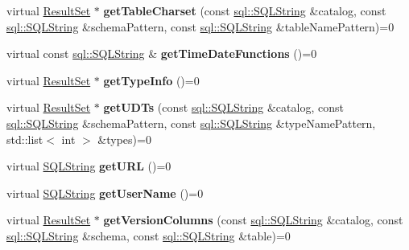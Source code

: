 \begin{DoxyCompactItemize}
\item 
\hypertarget{classsql_1_1_database_meta_data_aec136e1a062d248cb1c306965b2c70cf}{}\label{classsql_1_1_database_meta_data_aec136e1a062d248cb1c306965b2c70cf} 
virtual \hyperlink{classsql_1_1_result_set}{Result\+Set} $\ast$ {\bfseries get\+Table\+Charset} (const \hyperlink{classsql_1_1_s_q_l_string}{sql\+::\+S\+Q\+L\+String} \&catalog, const \hyperlink{classsql_1_1_s_q_l_string}{sql\+::\+S\+Q\+L\+String} \&schema\+Pattern, const \hyperlink{classsql_1_1_s_q_l_string}{sql\+::\+S\+Q\+L\+String} \&table\+Name\+Pattern)=0
\item 
\hypertarget{classsql_1_1_database_meta_data_ace7a16a15c96196290fa85198a00cfdb}{}\label{classsql_1_1_database_meta_data_ace7a16a15c96196290fa85198a00cfdb} 
virtual const \hyperlink{classsql_1_1_s_q_l_string}{sql\+::\+S\+Q\+L\+String} \& {\bfseries get\+Time\+Date\+Functions} ()=0
\item 
\hypertarget{classsql_1_1_database_meta_data_acf8340fcb22c308f2f1a7cb65519562a}{}\label{classsql_1_1_database_meta_data_acf8340fcb22c308f2f1a7cb65519562a} 
virtual \hyperlink{classsql_1_1_result_set}{Result\+Set} $\ast$ {\bfseries get\+Type\+Info} ()=0
\item 
\hypertarget{classsql_1_1_database_meta_data_a35017d040f6af3cf706f7a7ba5d11998}{}\label{classsql_1_1_database_meta_data_a35017d040f6af3cf706f7a7ba5d11998} 
virtual \hyperlink{classsql_1_1_result_set}{Result\+Set} $\ast$ {\bfseries get\+U\+D\+Ts} (const \hyperlink{classsql_1_1_s_q_l_string}{sql\+::\+S\+Q\+L\+String} \&catalog, const \hyperlink{classsql_1_1_s_q_l_string}{sql\+::\+S\+Q\+L\+String} \&schema\+Pattern, const \hyperlink{classsql_1_1_s_q_l_string}{sql\+::\+S\+Q\+L\+String} \&type\+Name\+Pattern, std\+::list$<$ int $>$ \&types)=0
\item 
\hypertarget{classsql_1_1_database_meta_data_a90b95eca91e938bd6242a7b93c217633}{}\label{classsql_1_1_database_meta_data_a90b95eca91e938bd6242a7b93c217633} 
virtual \hyperlink{classsql_1_1_s_q_l_string}{S\+Q\+L\+String} {\bfseries get\+U\+RL} ()=0
\item 
\hypertarget{classsql_1_1_database_meta_data_a9fe385fcc9618981b70cd5f2ae4163ba}{}\label{classsql_1_1_database_meta_data_a9fe385fcc9618981b70cd5f2ae4163ba} 
virtual \hyperlink{classsql_1_1_s_q_l_string}{S\+Q\+L\+String} {\bfseries get\+User\+Name} ()=0
\item 
\hypertarget{classsql_1_1_database_meta_data_a0217b3964e564039c9e616ace17ed9fa}{}\label{classsql_1_1_database_meta_data_a0217b3964e564039c9e616ace17ed9fa} 
virtual \hyperlink{classsql_1_1_result_set}{Result\+Set} $\ast$ {\bfseries get\+Version\+Columns} (const \hyperlink{classsql_1_1_s_q_l_string}{sql\+::\+S\+Q\+L\+String} \&catalog, const \hyperlink{classsql_1_1_s_q_l_string}{sql\+::\+S\+Q\+L\+String} \&schema, const \hyperlink{classsql_1_1_s_q_l_string}{sql\+::\+S\+Q\+L\+String} \&table)=0

\end{DoxyCompactItemize}
